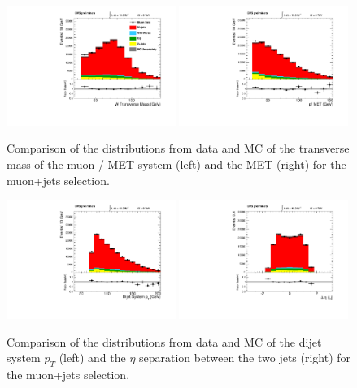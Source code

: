 \begin{figure}[h!t]
  {\centering
    \includegraphics[width=0.49\textwidth]{figs/n-1_plots_mu/mu_W_mt.pdf}
    \includegraphics[width=0.49\textwidth]{figs/n-1_plots_mu/mu_event_met_pfmet.pdf}
    \caption{Comparison of the distributions from data and MC of the
     transverse mass of the muon / MET system (left) and the MET (right)
    for the muon+jets selection. 
    }
    \label{fig:mu_W_Mt}}
\end{figure}
\begin{figure}[h!t]
  {\centering
    \includegraphics[width=0.49\textwidth]{figs/n-1_plots_mu/mu_dijet_pt.pdf}
    \includegraphics[width=0.49\textwidth]{figs/n-1_plots_mu/mu_deltaeta_jj.pdf}
    \caption{Comparison of the distributions from
      data and MC of the dijet system $p_{T}$ (left)
      and the $\eta $ separation between the two jets (right) for the muon+jets selection. 
      }
    \label{fig:mu_dijet}}
\end{figure}
